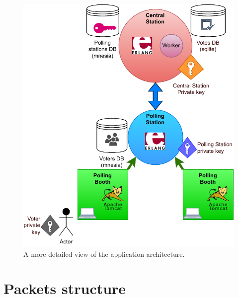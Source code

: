 \begin{figure}[H]
    \begin{center}
        \includegraphics[scale=1]{img/arch_detail.pdf}
    \end{center}
    \vspace*{-0.5cm}
    \caption{A more detailed view of the application architecture.}
    \label{fig:arch_detail}
\end{figure}

\section{Packets structure}